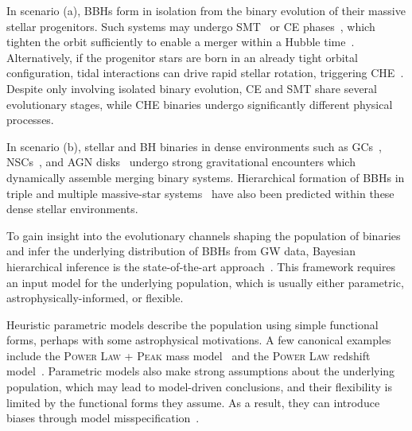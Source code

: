 \documentclass[twocolumn, twocolappendix]{aastex631}
\begin{document}
In scenario (a), \acp{BBH} form in isolation from the binary evolution of their massive stellar progenitors. Such systems may undergo \ac{SMT}~\citep{vandenHeuvel:2017pwp,Neijssel:2019irh,Gallegos-Garcia:2021hti,Briel:2022cfl} or \ac{CE} phases~\citep{1976IAUS...73.....E,Paczynski_1976,Tutukov:1993bse,Bethe:1998bn,2002ApJ...572..407B,Stevenson:2017tfq,Giacobbo:2018etu,Dominik:2012kk,Ivanova:2012vx,Bavera:2020uch}, which tighten the orbit sufficiently to enable a merger within a Hubble time~\citep{Peters:1964zz,Zevin:2020gbd}. Alternatively, if the progenitor stars are born in an already tight orbital configuration, tidal interactions can drive rapid stellar rotation, triggering \ac{CHE}~\citep{deMink:2009jq,Mandel:2015qlu, deMink:2016vkw, Marchant:2016wow,duBuisson:2020asn}. Despite only involving isolated binary evolution, \ac{CE} and \ac{SMT} share several evolutionary stages, while \ac{CHE} binaries undergo significantly different physical processes.

In scenario (b), stellar and BH binaries in dense environments such as \acp{GC}~\citep{Sigurdsson:1993zrm,Sigurdsson:1993tui,PortegiesZwart:1999nm,Miller:2002pg,Lightman:1978zz,Hut:1992wz,Fregeau:2006es,OLeary:2005vqo,Downing:2009ag,Rodriguez:2015oxa,Rodriguez:2016kxx,Rodriguez:2019huv,Askar:2016jwt}, \acp{NSC}~\citep{PortegiesZwart:1999nm,Miller:2008yw,Banerjee:2009hs,Rodriguez:2019huv,Zahn:1977mi}, and \ac{AGN} disks~\citep{Antonini:2016gqe,Mckernan:2017ssq,McKernan:2019beu,Stone:2016wzz,Tagawa:2019osr,Tagawa:2021ofj,Bartos_2017,Yang:2020lhq} undergo strong gravitational encounters which dynamically assemble merging binary systems. Hierarchical formation of \acp{BBH} in triple and multiple massive-star systems~\citep{Sana_2014,Silsbee:2016djf,Rodriguez:2018jqu,Gupta:2019unn,Toonen_2020} have also been predicted within these dense stellar environments.

To gain insight into the evolutionary channels shaping the population of binaries and infer the underlying distribution of \acp{BBH} from \ac{GW} data, Bayesian hierarchical inference is the state-of-the-art approach~\citep{Vitale:2020aaz,Thrane:2018qnx,Callister:2024cdx,LIGOScientific:2018jsj,LIGOScientific:2020kqk,KAGRA:2021duu}. This framework requires an input model for the underlying population, which is usually either parametric, astrophysically-informed, or flexible.

Heuristic parametric models describe the population using simple functional forms, perhaps with some astrophysical motivations. A few canonical examples include the \textsc{Power Law + Peak} mass model~\citep{Talbot:2018cva} and the \textsc{Power Law} redshift model~\citep{Fishbach:2018edt}. Parametric models also make strong assumptions about the underlying population, which may lead to model-driven conclusions, and their flexibility is limited by the functional forms they assume. As a result, they can introduce biases through model misspecification~\citep{Romero-Shaw:2022ctb,Cheng:2023ddt}.
\end{document}
